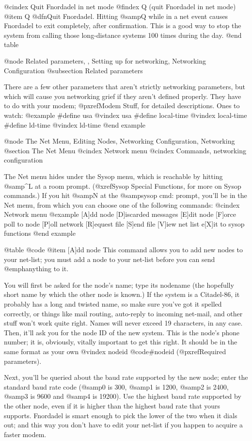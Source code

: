 @cindex Quit Fnordadel in net mode
@findex Q (quit Fnordadel in net mode)
@item Q
@dfn{Quit Fnordadel}.  Hitting @samp{Q} while in a net event causes Fnordadel
to exit completely, after confirmation.  This is a good way to stop the
system from calling those long-distance systems 100 times during the day.
@end table

@node Related parameters,  , Setting up for networking, Networking Configuration
@subsection Related parameters

There are a few other parameters that aren't strictly
networking parameters, but which will cause you networking grief
if they aren't defined properly.  They have to do with your
modem; @pxref{Modem Stuff}, for detailed descriptions.  Ones to watch:
@example
#define usa
@vindex usa
#define local-time
@vindex local-time
#define ld-time
@vindex ld-time
@end example

@node The Net Menu, Editing Nodes, Networking Configuration, Networking
@section The Net Menu
@cindex Network menu
@cindex Commands, networking configuration

The Net menu hides under the Sysop menu, which is reachable by
hitting @samp{^L} at a room prompt.  (@xref{Sysop Special Functions},
for more on Sysop commands.)
If you hit @samp{N} at the @samp{sysop cmd:} prompt, you'll be in the Net menu, from
which you can choose one of the following commands:
@cindex Network menu
@example
[A]dd node
[D]iscarded messages
[E]dit node
[F]orce poll to node
[P]oll network
[R]equest file
[S]end file
[V]iew net list
e[X]it to sysop functions
@end example

@table @code
@item [A]dd node
This command allows you to add new nodes to your net-list;
you must add a node to your net-list before you can send @emph{anything} to it.

You will first be asked for the node's name; type its
nodename (the hopefully short name by which the other node is
known.)  If the system is a Citadel-86, it probably has a long
and twisted name, so make sure you've got it spelled
correctly, or things like mail routing, auto-reply to incoming net-mail,
and other stuff won't work quite right.  Names will never exceed 19
characters, in any case.  Then, it'll ask you for the node ID of
the new system.  This is the node's phone number; it is, obviously,
vitally important to get this right.  It should be in the same format
as your own
@vindex nodeid
@code{#nodeid} (@pxref{Required parameters}).

Next, you'll be queried about the baud rate supported by
the new node; enter the standard baud rate code (@samp{0} is 300, @samp{1} is
1200, @samp{2} is 2400, @samp{3} is 9600 and @samp{4} is 19200).  Use
the highest baud rate
supported by the other node, even if it is higher than the highest
baud rate that yours supports.  Fnordadel is smart enough to pick
the lower of the two when it dials out; and this way you don't have
to edit your net-list if you happen to acquire a faster modem.  

